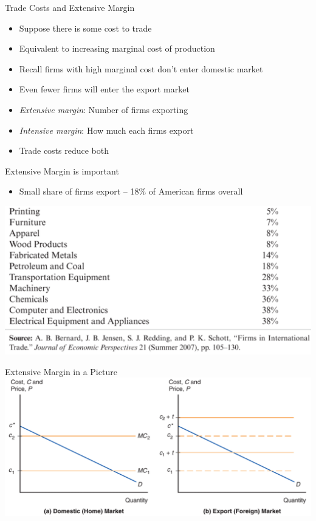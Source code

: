 \documentclass{beamer}
\begin{document}
\begin{frame}{Trade Costs and Extensive Margin} 
    \begin{itemize}
        \item Suppose there is some cost to trade 
        \item Equivalent to increasing marginal cost of production
        \item Recall firms with high marginal cost don't enter domestic market 
        \item Even fewer firms will enter the export market
        \item \emph{Extensive margin}: Number of firms exporting
        \item \emph{Intensive margin}: How much each firms export
        \item Trade costs reduce both
    \end{itemize}
\end{frame}

\begin{frame}{Extensive Margin is important} 
    \begin{itemize}
        \item Small share of firms export -- 18\% of American firms overall 
    \end{itemize}
    \includegraphics[scale=0.20]{bjrs_firms.png}
\end{frame}

\begin{frame}{Extensive Margin in a Picture} 
    \includegraphics[scale=0.20]{trade_costs_firms.png}
\end{frame}
\end{document}
